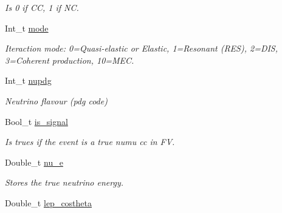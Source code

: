 \begin{DoxyCompactItemize}
\begin{DoxyCompactList}\small\item\em Is 0 if C\-C, 1 if N\-C. \end{DoxyCompactList}\item 
\hypertarget{classUBXSecEvent_ad9e14416b90b2b688ce1ff6361f8448a}{Int\-\_\-t \hyperlink{classUBXSecEvent_ad9e14416b90b2b688ce1ff6361f8448a}{mode}}\label{classUBXSecEvent_ad9e14416b90b2b688ce1ff6361f8448a}

\begin{DoxyCompactList}\small\item\em Iteraction mode\-: 0=Quasi-\/elastic or Elastic, 1=Resonant (R\-E\-S), 2=D\-I\-S, 3=Coherent production, 10=M\-E\-C. \end{DoxyCompactList}\item 
\hypertarget{classUBXSecEvent_a61f5c298a7cebb0c5286b4ed4c7a0627}{Int\-\_\-t \hyperlink{classUBXSecEvent_a61f5c298a7cebb0c5286b4ed4c7a0627}{nupdg}}\label{classUBXSecEvent_a61f5c298a7cebb0c5286b4ed4c7a0627}

\begin{DoxyCompactList}\small\item\em Neutrino flavour (pdg code) \end{DoxyCompactList}\item 
\hypertarget{classUBXSecEvent_a2cc7d9f302e0d413ece8af96b35fcff0}{Bool\-\_\-t \hyperlink{classUBXSecEvent_a2cc7d9f302e0d413ece8af96b35fcff0}{is\-\_\-signal}}\label{classUBXSecEvent_a2cc7d9f302e0d413ece8af96b35fcff0}

\begin{DoxyCompactList}\small\item\em Is trues if the event is a true numu cc in F\-V. \end{DoxyCompactList}\item 
\hypertarget{classUBXSecEvent_a715a5f6d8143a633109ed48fb87e0bbd}{Double\-\_\-t \hyperlink{classUBXSecEvent_a715a5f6d8143a633109ed48fb87e0bbd}{nu\-\_\-e}}\label{classUBXSecEvent_a715a5f6d8143a633109ed48fb87e0bbd}

\begin{DoxyCompactList}\small\item\em Stores the true neutrino energy. \end{DoxyCompactList}\item 
\hypertarget{classUBXSecEvent_a57ac9edd2e200ea54da22ee278079857}{Double\-\_\-t \hyperlink{classUBXSecEvent_a57ac9edd2e200ea54da22ee278079857}{lep\-\_\-costheta}}\label{classUBXSecEvent_a57ac9edd2e200ea54da22ee278079857}


\end{DoxyCompactItemize}
